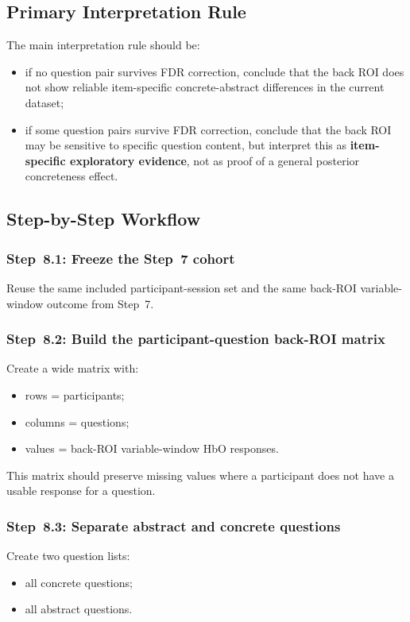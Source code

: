 \documentclass[11pt]{article}
\begin{document}
\subsection{Primary Interpretation Rule}
The main interpretation rule should be:
\begin{itemize}
    \item if no question pair survives FDR correction, conclude that the back ROI does not show
    reliable item-specific concrete-abstract differences in the current dataset;
    \item if some question pairs survive FDR correction, conclude that the back ROI may be sensitive
    to specific question content, but interpret this as \textbf{item-specific exploratory evidence},
    not as proof of a general posterior concreteness effect.
\end{itemize}

\subsection{Step-by-Step Workflow}

\subsubsection{Step~8.1: Freeze the Step~7 cohort}
Reuse the same included participant-session set and the same back-ROI variable-window outcome from Step~7.

\subsubsection{Step~8.2: Build the participant-question back-ROI matrix}
Create a wide matrix with:
\begin{itemize}
    \item rows = participants;
    \item columns = questions;
    \item values = back-ROI variable-window HbO responses.
\end{itemize}

This matrix should preserve missing values where a participant does not have a usable response for a question.

\subsubsection{Step~8.3: Separate abstract and concrete questions}
Create two question lists:
\begin{itemize}
    \item all concrete questions;
    \item all abstract questions.
\end{itemize}
\end{document}
